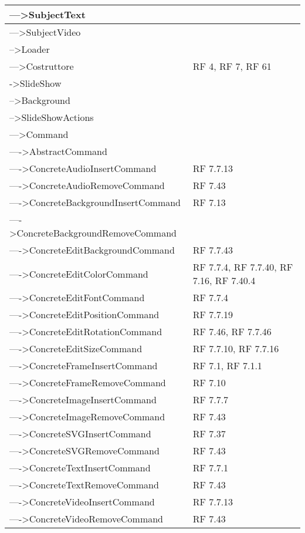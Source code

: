 {\begin{longtable} [c]{| p{8cm} | p{5cm} |}
 \hline 
--->SubjectText & \\ 
 \hline 
--->SubjectVideo & \\ 
 \hline 
-->Loader & \\ 
 \hline 
--->Costruttore & RF 4, RF 7, RF 61\\ 
 \hline 
->SlideShow & \\ 
 \hline 
-->Background & \\ 
 \hline 
-->SlideShowActions & \\ 
 \hline 
--->Command & \\ 
 \hline 
---->AbstractCommand & \\ 
 \hline 
---->ConcreteAudioInsertCommand & RF 7.7.13\\ 
 \hline 
---->ConcreteAudioRemoveCommand & RF 7.43\\ 
 \hline 
---->ConcreteBackgroundInsertCommand & RF 7.13\\ 
 \hline 
---->ConcreteBackgroundRemoveCommand & \\ 
 \hline 
---->ConcreteEditBackgroundCommand & RF 7.7.43\\ 
 \hline 
---->ConcreteEditColorCommand & RF 7.7.4, RF 7.7.40, RF 7.16, RF 7.40.4\\ 
 \hline 
---->ConcreteEditFontCommand & RF 7.7.4\\ 
 \hline 
---->ConcreteEditPositionCommand & RF 7.7.19\\ 
 \hline 
---->ConcreteEditRotationCommand & RF 7.46, RF 7.7.46\\ 
 \hline 
---->ConcreteEditSizeCommand & RF 7.7.10, RF 7.7.16\\ 
 \hline 
---->ConcreteFrameInsertCommand & RF 7.1, RF 7.1.1\\ 
 \hline 
---->ConcreteFrameRemoveCommand & RF 7.10\\ 
 \hline 
---->ConcreteImageInsertCommand & RF 7.7.7\\ 
 \hline 
---->ConcreteImageRemoveCommand & RF 7.43\\ 
 \hline 
---->ConcreteSVGInsertCommand & RF 7.37\\ 
 \hline 
---->ConcreteSVGRemoveCommand & RF 7.43\\ 
 \hline 
---->ConcreteTextInsertCommand & RF 7.7.1\\ 
 \hline 
---->ConcreteTextRemoveCommand & RF 7.43\\ 
 \hline 
---->ConcreteVideoInsertCommand & RF 7.7.13\\ 
 \hline 
---->ConcreteVideoRemoveCommand & RF 7.43\\ 

\end{longtable}}
